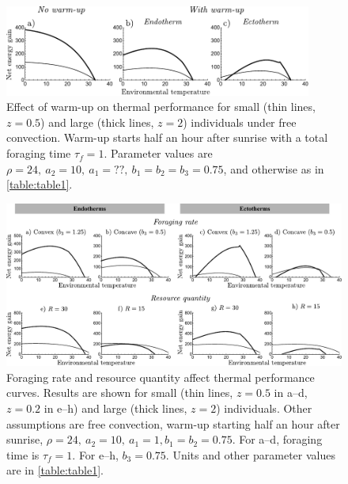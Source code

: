 %
\begin{figure}
\centering \includegraphics[width=0.9\textwidth]{fig4}
\caption{
    \setstretch{\stretchby}
    Effect of warm-up on thermal performance for small (thin lines, $z = 0.5$) and large (thick lines, $z = 2$) individuals under free convection.
    Warm-up starts half an hour after sunrise with a total foraging time $\tau_f = 1$.
    Parameter values are $\rho = 24,\ a_2 = 10,\ a_1 = ??,\ b_1 = b_2 = b_3 = 0.75$, and otherwise as in \cref{table:table1}. %
}
\label{fig4}
\end{figure}

\clearpage

\begin{figure}
\includegraphics[width=\textwidth]{fig5}
\caption{
    \setstretch{\stretchby}
	Foraging rate and resource quantity affect thermal performance curves.
	Results are shown for small (thin lines, $z = 0.5$ in a--d, $z = 0.2$ in e--h) and large (thick lines, $z = 2$) individuals.
	Other assumptions are free convection, warm-up starting half an hour after sunrise, $\rho = 24,\ a_2 = 10,\ a_1 = 1, b_1 = b_2 = 0.75 $.
    For a--d, foraging time is $\tau_f = 1$.
    For e--h, $b_3 = 0.75$.
    Units and other parameter values are in \cref{table:table1}.
}
\label{fig5}
\end{figure}
